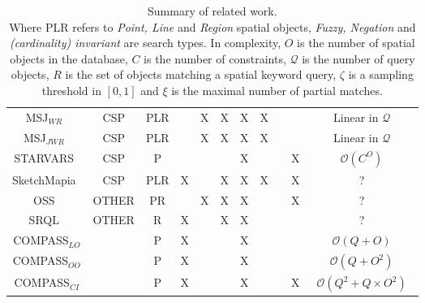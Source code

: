 {\begin{table*}[t]
\begin{center}
\begin{tabular}{|c|ccccccccc|c|}
            MSJ$_{WR}$~\cite{Papadias1998}              & CSP         & PLR &   & X & X & X & X &   &   & Linear in $\mathcal{Q}$ \\
            MSJ$_{JWR}$~\cite{Papadias1998}             & CSP         & PLR &   & X & X & X & X &   &   & Linear in $\mathcal{Q}$ \\
            STARVARS~\cite{Lee2013}                     & CSP         & P   &   &   &   & X &   &   & X & $\mathcal{O}(C^O)$ \\
            SketchMapia~\cite{Schwering2014}            & CSP         & PLR & X &   & X & X & X &   & X & ? \\
            OSS~\cite{Liu2003}                          & OTHER       & PR  &   & X & X & X &   &   & X & ? \\
            SRQL~\cite{Dellapenna2012,Dellapenna2017}   & OTHER       & R   & X &   & X & X &   &   &   & ? \\
            COMPASS$_{LO}$                              &             & P   & X &   &   & X &   &   &   & $\mathcal{O}(Q + O)$ \\    
            COMPASS$_{OO}$                              &             & P   & X &   &   & X &   &   &   & $\mathcal{O}(Q + O^2)$ \\  
            COMPASS$_{CI}$                              &             & P   & X &   &   & X &   &   & X & ~$\mathcal{O}(Q^2 + Q\times O^2)$~ \\
            
            
            
            \hline     
        \end{tabular}
        \caption{Summary of related work. \\ \textnormal{Where PLR refers to \textit{Point, Line} and \textit{Region} spatial objects, \textit{Fuzzy, Negation} and \textit{(cardinality) invariant} are search types. In complexity, $O$ is the number of spatial objects in the database, $C$ is the number of constraints, $\mathcal{Q}$ is the number of query objects, $R$ is the set of objects matching a spatial keyword query, $\zeta$ is a sampling threshold in $[0,1]$ and $\xi$ is the maximal number of partial matches.}} 
        \label{Table:related_work}
    \end{center}
\end{table*}
}


